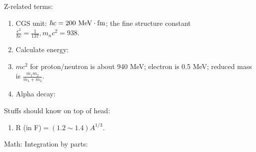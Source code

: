 \documentclass{school-22.101-notes}
\date{December 13, 2011}
\begin{document}
\maketitle



Z-related terms: 
\begin{enumerate}
\item CGS unit: $\hbar c = 200 \mbox{ } \mathrm{MeV} \cdot \mathrm{fm}$; the fine structure constant $\frac{e^2}{\hbar c} = \frac{1}{137}, m_n c^2 = 938.$
\item Calculate energy:
\item $mc^2$ for proton/neutron is about 940 MeV; electron is 0.5 MeV; reduced mass is $\frac{m_1 m_2}{m_1 + m_2}$. 
\item Alpha decay:
\end{enumerate}

Stuffs should know on top of head: 
\begin{enumerate}
\item R (in F)$ = (1.2 \sim 1.4) A^{1/3}.$
\end{enumerate}


Math: 
Integration by parts: 
\end{document}
